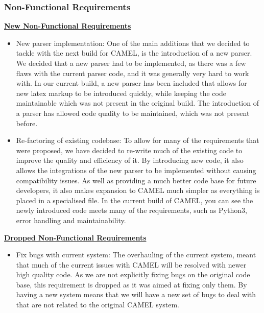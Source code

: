 \subsubsection*{Non-Functional Requirements}
	\underline{\textbf{New Non-Functional Requirements}}
	\begin{itemize}
		
		\item New parser implementation: One of the main additions that we decided to tackle with the next build for CAMEL, is the introduction of a new parser. We decided that a new parser had to be implemented, as there was a few flaws with the current parser code, and it was generally very hard to work with. In our current build, a new parser has been included that allows for new latex markup to be introduced quickly, while keeping the code maintainable which was not present in the original build. The introduction of a parser has allowed code quality to be maintained, which was not present before.   
		
		\item Re-factoring of existing codebase: To allow for many of the requirements that were proposed, we have decided to re-write much of the existing code to improve the quality and efficiency of it. By introducing new code, it also allows the integrations of the new parser to be implemented without causing compatibility issues. As well as providing a much better code base for future developers, it also makes expansion to CAMEL much simpler as everything is placed in a specialised file. In the current build of CAMEL, you can see the newly introduced code meets many of the requirements, such as Python3, error handling and maintainability. 
	\end{itemize}
	
	\underline{\textbf{Dropped Non-Functional Requirements}}
	\begin{itemize}
		\item Fix bugs with current system: The overhauling of the current system, meant that much of the current issues with CAMEL will be resolved with newer high quality code. As we are not explicitly fixing bugs on the original code base, this requirement is dropped as it was aimed at fixing only them. By having a new system means that we will have a new set of bugs to deal with that are not related to the original CAMEL system.
	\end{itemize}
	